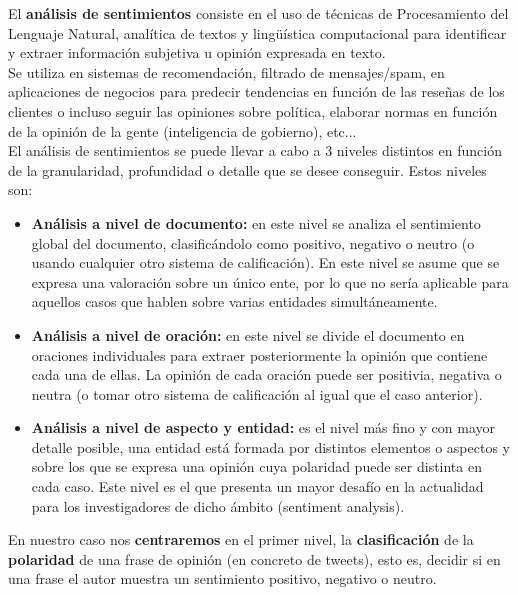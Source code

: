 \documentclass[a4paper,12pt]{report}
\begin{document}
\vspace{4mm}
El \textbf{análisis de sentimientos} consiste en el uso de técnicas de Procesamiento del Lenguaje Natural, analítica de textos y lingüística computacional para identificar y extraer información subjetiva u opinión expresada en texto. 
\vspace{2mm}\\
Se utiliza en sistemas de recomendación, filtrado de mensajes/spam, en aplicaciones de negocios para predecir tendencias en función de las reseñas de los clientes o incluso seguir las opiniones sobre política, elaborar normas en función de la opinión de la gente (inteligencia de gobierno), etc...
\vspace{4mm}\\
El análisis de sentimientos se puede llevar a cabo a 3 niveles distintos en función de la granularidad, profundidad o detalle que se desee conseguir. Estos niveles son:

\begin{itemize}
\item \textbf{Análisis a nivel de documento:} en este nivel se analiza el sentimiento global del documento, clasificándolo como positivo, negativo o neutro (o usando cualquier otro sistema de calificación). En este nivel se asume que se expresa una valoración sobre un único ente, por lo que no sería aplicable para aquellos casos que hablen sobre varias entidades simultáneamente.  

\item \textbf{Análisis a nivel de oración:} en este nivel se divide el documento en oraciones individuales para extraer posteriormente la opinión que contiene cada una de ellas. La opinión de cada oración puede ser positivia, negativa o neutra (o tomar otro sistema de calificación al igual que el caso anterior). 

\item \textbf{Análisis a nivel de aspecto y entidad:} es el nivel más fino y con mayor detalle posible, una entidad está formada por distintos elementos o aspectos y sobre los que se expresa una opinión cuya polaridad puede ser distinta en cada caso. Este nivel es el que presenta un mayor desafío en la actualidad para los investigadores de dicho ámbito (sentiment analysis). 

\end{itemize}
\vspace{2mm}

{\setlength{\parindent}{0cm}
En nuestro caso nos \textbf{centraremos} en el primer nivel,  la \textbf{clasificación} de la \textbf{polaridad} de una frase de opinión (en concreto de tweets), esto es, decidir si en una frase el autor muestra un sentimiento positivo, negativo o neutro.}
\end{document}
